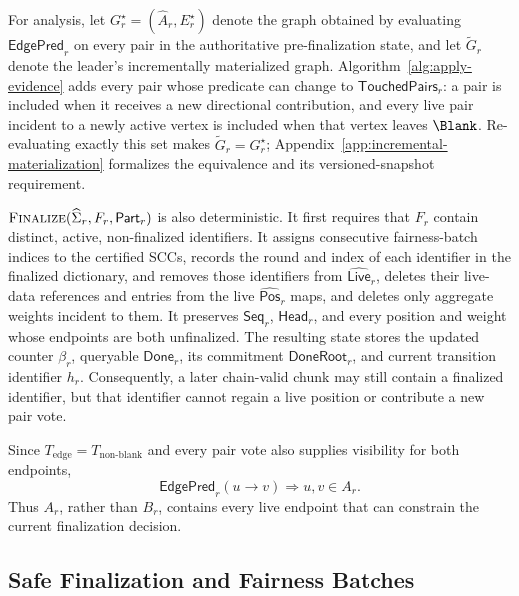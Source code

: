 For analysis, let $G_r^\star=(\widehat A_r,E_r^\star)$ denote the graph
obtained by evaluating $\mathsf{EdgePred}_r$ on every pair in the authoritative
pre-finalization state, and let $\widetilde G_r$ denote the leader's
incrementally materialized graph.  Algorithm~\ref{alg:apply-evidence} adds
every pair whose predicate can change to $\mathsf{TouchedPairs}_r$: a pair is
included when it receives a new directional contribution, and every live pair
incident to a newly active vertex is included when that vertex leaves
$\Blank$.  Re-evaluating exactly this set makes
$\widetilde G_r=G_r^\star$; Appendix~\ref{app:incremental-materialization}
formalizes the equivalence and its versioned-snapshot requirement.

$\textsc{Finalize}(\widehat\Sigma_r,F_r,\mathsf{Part}_r)$ is also deterministic.  It first
requires that $F_r$ contain distinct, active, non-finalized identifiers.  It
assigns consecutive fairness-batch indices to the certified SCCs, records the
round and index of each identifier in the finalized dictionary, and removes
those identifiers from
$\widehat{\mathsf{Live}}_r$, deletes their live-data references and entries from the live
$\widehat{\mathsf{Pos}}_r$ maps, and deletes only aggregate weights incident
to them.  It preserves $\mathsf{Seq}_r$, $\mathsf{Head}_r$, and every position
and weight whose endpoints are both unfinalized.  The resulting state stores
the updated counter $\beta_r$, queryable $\mathsf{Done}_r$, its commitment
$\mathsf{DoneRoot}_r$, and current transition identifier $h_r$.
Consequently, a later chain-valid chunk may still contain a finalized
identifier, but that identifier cannot regain a live position or contribute a
new pair vote.

Since $T_{\mathrm{edge}}=T_{\mathrm{non\mbox{-}blank}}$ and every pair vote
also supplies visibility for both endpoints,
\[
 \mathsf{EdgePred}_r(u\to v)\Longrightarrow u,v\in A_r.
 \tag{10}\label{eq:edge-active-closure}
\]
Thus $A_r$, rather than $B_r$, contains every live endpoint that can constrain
the current finalization decision.

\subsection{Safe Finalization and Fairness Batches}
\label{sec:safe-extraction}

